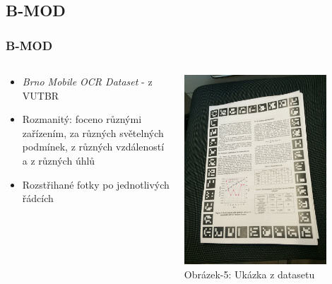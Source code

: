 \documentclass{beamer}
\begin{document}
\subsection{B-MOD}
\begin{frame}
\frametitle{B-MOD}
		\begin{columns}
		\begin{column}{0.5\textwidth}
\begin{itemize}
\item \emph{Brno Mobile OCR Dataset} - z VUTBR
\item Rozmanitý: foceno různými zařízením, za různých světelných podmínek, z různých vzdáleností a z různých úhlů
\item Rozstřihané fotky po jednotlivých řádcích
\end{itemize}
		\end{column}
		\begin{column}{0.5\textwidth}
    	\begin{center}
     	\includegraphics[width=0.8\textwidth]{img/bmod-sample.jpg}\\
     	Obrázek-5: Ukázka z datasetu
     	\end{center}
		\end{column}
		\end{columns}
\end{frame}
\end{document}
